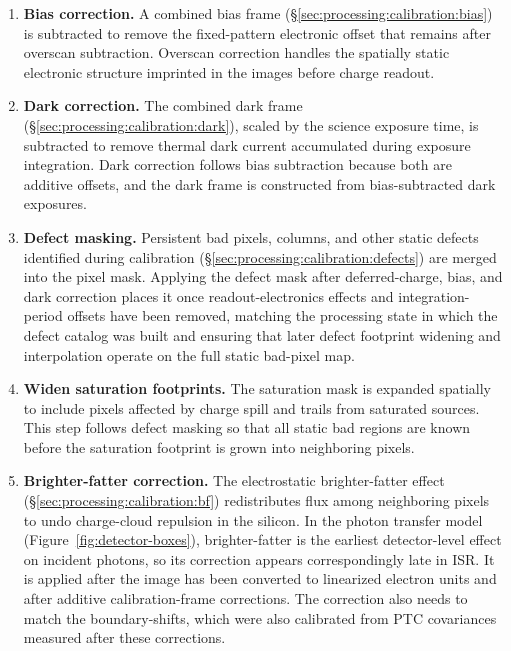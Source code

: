 \begin{enumerate}
    \item \textbf{Bias correction.}
    A combined bias frame (\S\ref{sec:processing:calibration:bias}) is subtracted to remove the fixed-pattern electronic offset that remains after overscan subtraction.
    Overscan correction handles the spatially static electronic structure imprinted in the images before charge readout.

    \item \textbf{Dark correction.}
    The combined dark frame (\S\ref{sec:processing:calibration:dark}), scaled by the science exposure time, is subtracted to remove thermal dark current accumulated during exposure integration.
    Dark correction follows bias subtraction because both are additive offsets, and the dark frame is constructed from bias-subtracted dark exposures.

    \item \textbf{Defect masking.}
    Persistent bad pixels, columns, and other static defects identified during calibration (\S\ref{sec:processing:calibration:defects}) are merged into the pixel mask.
    Applying the defect mask after deferred-charge, bias, and dark correction places it once readout-electronics effects and integration-period offsets have been removed, matching the processing state in which the defect catalog was built and ensuring that later defect footprint widening and interpolation operate on the full static bad-pixel map.

    \item \textbf{Widen saturation footprints.}
    The saturation mask is expanded spatially to include pixels affected by charge spill and trails from saturated sources.
    This step follows defect masking so that all static bad regions are known before the saturation footprint is grown into neighboring pixels.

    \item \textbf{Brighter-fatter correction.}
    The electrostatic brighter-fatter effect (\S\ref{sec:processing:calibration:bf}) redistributes flux among neighboring pixels to undo charge-cloud repulsion in the silicon.
    In the photon transfer model (Figure~\ref{fig:detector-boxes}), brighter-fatter is the earliest detector-level effect on incident photons, so its correction appears correspondingly late in ISR.
    It is applied after the image has been converted to linearized electron units and after additive calibration-frame corrections.
    The correction also needs to match the boundary-shifts, which were also calibrated from PTC covariances measured after these corrections.


\end{enumerate}
